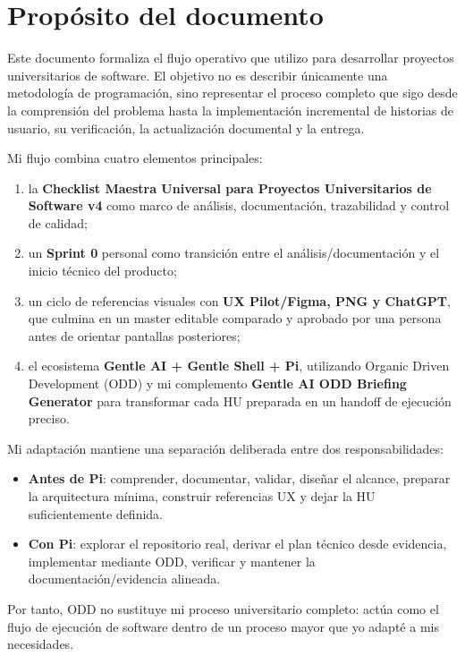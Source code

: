 \documentclass[11pt,a4paper]{article}
\begin{document}
\tableofcontents
\newpage

\section{Propósito del documento}

Este documento formaliza el flujo operativo que utilizo para desarrollar proyectos universitarios de software. El objetivo no es describir únicamente una metodología de programación, sino representar el proceso completo que sigo desde la comprensión del problema hasta la implementación incremental de historias de usuario, su verificación, la actualización documental y la entrega.

Mi flujo combina cuatro elementos principales:

\begin{enumerate}
    \item la \textbf{Checklist Maestra Universal para Proyectos Universitarios de Software v4} como marco de análisis, documentación, trazabilidad y control de calidad;
    \item un \textbf{Sprint 0} personal como transición entre el análisis/documentación y el inicio técnico del producto;
    \item un ciclo de referencias visuales con \textbf{UX Pilot/Figma, PNG y ChatGPT}, que culmina en un master editable comparado y aprobado por una persona antes de orientar pantallas posteriores;
    \item el ecosistema \textbf{Gentle AI + Gentle Shell + Pi}, utilizando Organic Driven Development (ODD) y mi complemento \textbf{Gentle AI ODD Briefing Generator} para transformar cada HU preparada en un handoff de ejecución preciso.
\end{enumerate}

\begin{principlebox}
Mi adaptación mantiene una separación deliberada entre dos responsabilidades:

\begin{itemize}
    \item \textbf{Antes de Pi}: comprender, documentar, validar, diseñar el alcance, preparar la arquitectura mínima, construir referencias UX y dejar la HU suficientemente definida.
    \item \textbf{Con Pi}: explorar el repositorio real, derivar el plan técnico desde evidencia, implementar mediante ODD, verificar y mantener la documentación/evidencia alineada.
\end{itemize}

Por tanto, ODD no sustituye mi proceso universitario completo: actúa como el flujo de ejecución de software dentro de un proceso mayor que yo adapté a mis necesidades.
\end{principlebox}
\end{document}

